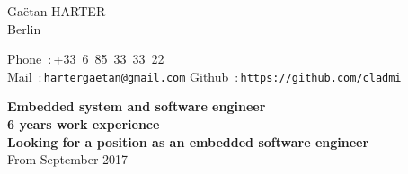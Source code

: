 \documentclass{cv}
\begin{document}
\begin{chapeau}
\hspace{1cm}
\begin{adresse}
        Gaëtan HARTER\\
        Berlin \\
\end{adresse}
\begin{etatcivil}
        Phone~:\,+33~6~85~33~33~22\\
        Mail~:\,\texttt{hartergaetan@gmail.com}
        Github~:\,\texttt{https://github.com/cladmi}
\end{etatcivil}
\hspace{0.5cm}
\end{chapeau}
\vspace{0.5cm}
\begin{center}
        \textbf{\Large Embedded system and software engineer\\}
        \textbf{\large 6 years work experience\\}
        \vspace{0.5em}
        \textbf{\large Looking for a position as an embedded software engineer\\} %
        {From September 2017}
\end{center}



\end{document}
